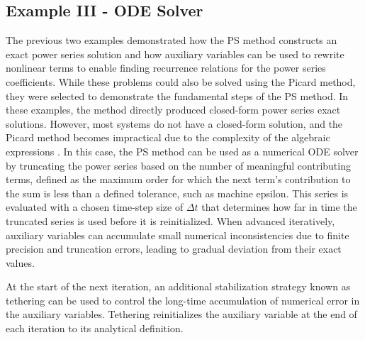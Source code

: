 \documentclass[draft]{agujournal2019}
\begin{document}
\subsection{Example III - ODE Solver}\label{Intro: ExIII}
The previous two examples demonstrated how the PS method constructs an exact power series solution and how auxiliary variables can be used to rewrite nonlinear terms to enable finding recurrence relations for the power series coefficients. While these problems could also be solved using the Picard method, they were selected to demonstrate the fundamental steps of the PS method. In these examples, the method directly produced closed-form power series exact solutions. However, most systems do not have a closed-form solution, and the Picard method becomes impractical due to the complexity of the algebraic expressions \cite{Ansari2024, Leal2015, Rudmin1998}. In this case, the PS method can be used as a numerical ODE solver by truncating the power series based on the number of meaningful contributing terms, defined as the maximum order for which the next term’s contribution to the sum is less than a defined tolerance, such as machine epsilon. This series is evaluated with a chosen time-step size of $\Delta t$ that determines how far in time the truncated series is used before it is reinitialized. When advanced iteratively, auxiliary variables can accumulate small numerical inconsistencies due to finite precision and truncation errors, leading to gradual deviation from their exact values. 

At the start of the next iteration, an additional stabilization strategy known as tethering \cite{Stewart2009} can be used to control the long-time accumulation of numerical error in the auxiliary variables. Tethering reinitializes the auxiliary variable at the end of each iteration to its analytical definition.
\end{document}
